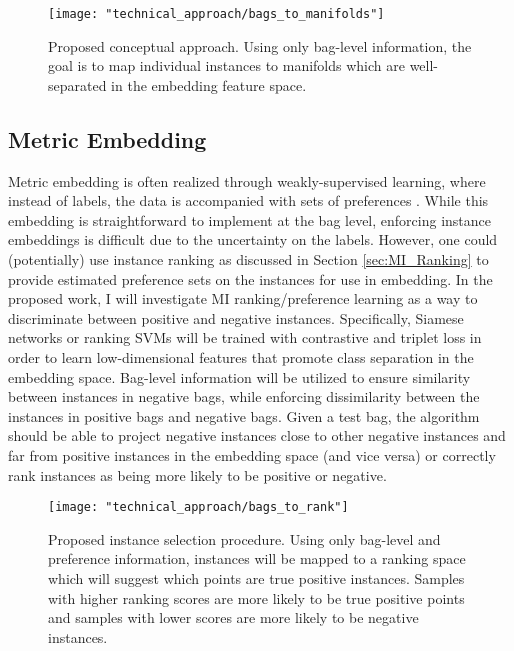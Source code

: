 \begin{center}
	\begin{figure*}[h]
		\centering
		\texttt{[image: "technical\_approach/bags\_to\_manifolds"]}
		\caption[Mapping of instances to separable manifolds]{Proposed conceptual approach.  Using only bag-level information, the goal is to map individual instances to manifolds which are well-separated in the embedding feature space.}
		\label{fig:proposed_manifold_learning}
	\end{figure*}
\end{center}

\subsection{Metric Embedding}
Metric embedding is often realized through weakly-supervised learning, where instead of labels, the data is accompanied with sets of preferences \citep{Hermans2017DefenseTripletLoss,Koch2015SiameseNetworks,Schroff2015FaceNet}. While this embedding is straightforward to implement at the bag level, enforcing instance embeddings is difficult due to the uncertainty on the labels.  However, one could (potentially) use instance ranking as discussed in Section \ref{sec:MI_Ranking} to provide estimated preference sets on the instances for use in embedding.  In the proposed work, I will investigate MI ranking/preference learning as a way to discriminate between positive and negative instances.  Specifically, Siamese networks or ranking SVMs will be trained with contrastive and triplet loss in order to learn low-dimensional features that promote class separation in the embedding space.  Bag-level information will be utilized to ensure similarity between instances in negative bags, while enforcing dissimilarity between the instances in positive bags and negative bags.  Given a test bag, the algorithm should be able to project negative instances close to other negative instances and far from positive instances in the embedding space (and vice versa) or correctly rank instances as being more likely to be positive or negative.

\begin{center}
	\begin{figure*}[h]
		\centering
		\texttt{[image: "technical\_approach/bags\_to\_rank"]}
		\caption[Ranking MIL instances]{Proposed instance selection procedure.  Using only bag-level and preference information, instances will be mapped to a ranking space which will suggest which points are true positive instances.  Samples with higher ranking scores are more likely to be true positive points and samples with lower scores are more likely to be negative instances.}
		\label{fig:proposed_metric_embedding}
	\end{figure*}
\end{center}

